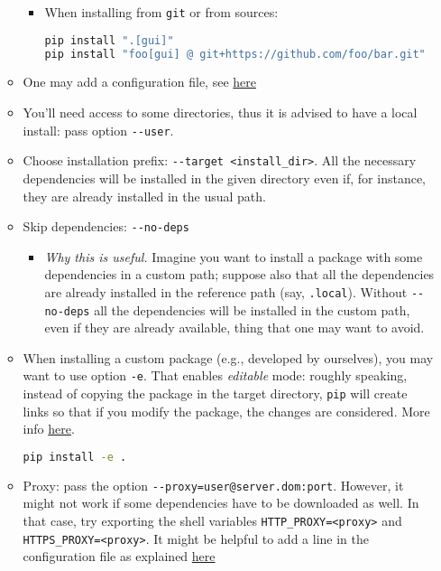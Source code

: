 \documentclass[a4paper,12pt,%
              final%
              ]{article}
\begin{document}
\begin{itemize}
\begin{itemize}
        \begin{itemize}
          \item When installing from \texttt{git} or from sources:
\begin{lstlisting}[language=bash]
pip install ".[gui]"
pip install "foo[gui] @ git+https://github.com/foo/bar.git"
\end{lstlisting}
        \end{itemize}
      \item One may add a configuration file, see \href{https://pip.pypa.io/en/stable/topics/configuration/}{here}
      \item You'll need access to some directories, thus it is advised to have a local install: pass option \verb|--user|.
      \item Choose installation prefix: \verb|--target <install_dir>|. All the necessary dependencies will be installed in the given directory even if, for instance, they are already installed in the usual path.
      \item Skip dependencies: \verb|--no-deps|
        \begin{itemize}
          \item \emph{Why this is useful.} Imagine you want to install a package with some dependencies in a custom path; suppose also that all the dependencies are already installed in the reference path (say, \texttt{.local}). Without \verb|--no-deps| all the dependencies will be installed in the custom path, even if they are already available, thing that one may want to avoid.
        \end{itemize}
      \item When installing a custom package (e.g., developed by ourselves), you may want to use option \verb|-e|. That enables \emph{editable} mode: roughly speaking, instead of copying the package in the target directory, \texttt{pip} will create links so that if you modify the package, the changes are considered. More info \href{https://setuptools.pypa.io/en/latest/userguide/development_mode.html}{here}.
\begin{lstlisting}[language=bash]
pip install -e .
\end{lstlisting}
      \item Proxy: pass the option \verb|--proxy=user@server.dom:port|. However, it might not work if some dependencies have to be downloaded as well. In that case, try exporting the shell variables \verb|HTTP_PROXY=<proxy>| and \verb|HTTPS_PROXY=<proxy>|. It might be helpful to add a line in the configuration file as explained \href{https://stackoverflow.com/questions/43473041/how-to-configure-pip-per-config-file-to-use-a-proxy-with-authentification}{here}

\end{itemize}
\end{itemize}
\end{document}

